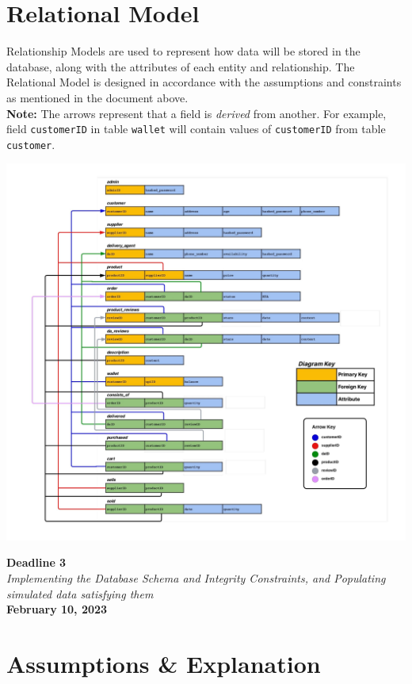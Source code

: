 \documentclass[12pt]{report}
\newcommand{\deadline}[3]{
    \hspace{0pt}
    \vfill
    \begin{center}
        \Huge \textbf{Deadline #1} \\
        \vspace*{5pt}
        \Large \textit{#2} \\
        \vspace*{25pt}
        \large \textbf{#3}
    \end{center}
    \vfill
    \pagebreak
}
\begin{document}
    \section*{\Huge Relational Model}
    \vspace*{10pt}
    Relationship Models are used to represent how data will be stored in the database, along with the attributes of each entity and relationship.
    The Relational Model is designed in accordance with the assumptions and constraints as mentioned in the document above. \\
    \newline
    \textbf{Note:} The arrows represent that a field is \textit{derived} from another.
    For example, field \verb|customerID| in table \verb|wallet| will contain values of \verb|customerID| from table \verb|customer|.
    \pagebreak
    \vspace*{35pt}
    \begin{center}
        \hspace*{-40pt}
        \includegraphics[scale=0.8]{Assets/Relational-Model}
    \end{center}

    \pagebreak

    \deadline{3}{Implementing the Database Schema and Integrity Constraints, and Populating simulated data satisfying them}{February 10, 2023}

    \section*{\Huge Assumptions \& Explanation}
\end{document}
